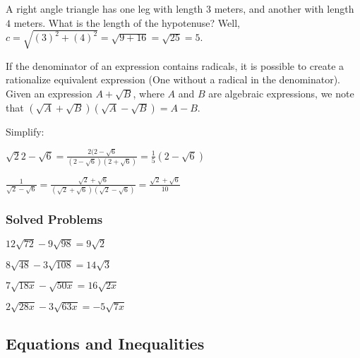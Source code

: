 \documentclass[crop=false,class=article,oneside]{standalone}
\begin{document}
        \begin{example}
        A right angle triangle has one leg with length $3$ meters, and another with length $4$ meters. What is the length of the hypotenuse? Well, $c = \sqrt{(3)^2+(4)^2} = \sqrt{9+16} = \sqrt{25} = 5$.
        \end{example}
        \begin{remark}
        If the denominator of an expression contains radicals, it is possible to create a rationalize equivalent expression (One without a radical in the denominator). Given an expression $A+\sqrt{B}$, where $A$ and $B$ are algebraic expressions, we note that $(\sqrt{A}+\sqrt{B})(\sqrt{A}-\sqrt{B}) = A-B$. 
        \end{remark}
        \begin{example}
        Simplify:
        \begin{enumerate}
        \begin{multicols}{2}
        \item $\sqrt{2}{2-\sqrt{6}} = \frac{2(2-\sqrt{6}}{(2-\sqrt{6})(2+\sqrt{6})} = \frac{1}{5}(2-\sqrt{6})$
        \item $\frac{1}{\sqrt{2}-\sqrt{6}} = \frac{\sqrt{2}+\sqrt{6}}{(\sqrt{2}+\sqrt{6})(\sqrt{2}-\sqrt{6})} = \frac{\sqrt{2}+\sqrt{6}}{10}$
        \end{multicols}
        \end{enumerate}
        \end{example}
        \subsubsection{Solved Problems}
        \begin{enumerate}
        \begin{multicols}{4}
        \item $12\sqrt{72} - 9\sqrt{98} = 9\sqrt{2}$
        \item $8\sqrt{48} - 3\sqrt{108} = 14\sqrt{3}$
        \item $7\sqrt{18x} - \sqrt{50x} = 16\sqrt{2x}$
        \item $2\sqrt{28x} - 3\sqrt{63x} = -5\sqrt{7x}$
        \end{multicols}
        \end{enumerate}
    \subsection{Equations and Inequalities}
\end{document}
